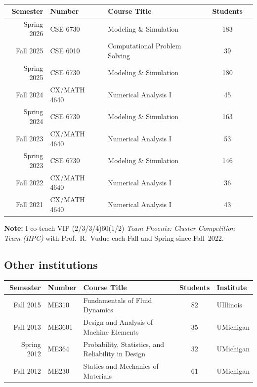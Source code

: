 \subsection{\GIT}

\begin{center}
    \begin{longtable}{ r l l c c }
        \bf Semester&\bf Number      & \bf Course Title                 & \bf Students  \\ \midrule
        Spring 2026 & CSE 6730       & Modeling \& Simulation           & 183 \\
        Fall 2025   & CSE 6010       & Computational Problem Solving    & \phantom{1}39 \\
        Spring 2025 & CSE 6730       & Modeling \& Simulation           & 180 \\
        Fall 2024   & CX/MATH 4640   & Numerical Analysis I             & \phantom{1}45 \\
        Spring 2024 & CSE 6730       & Modeling \& Simulation           & 163 \\
        Fall 2023   & CX/MATH 4640   & Numerical Analysis I             & \phantom{1}53 \\
        Spring 2023 & CSE 6730       & Modeling \& Simulation           & 146           \\
        Fall 2022   & CX/MATH 4640   & Numerical Analysis I             & \phantom{1}36 \\
        Fall 2021   & CX/MATH 4640   & Numerical Analysis I             & \phantom{1}43 
    \end{longtable}
\end{center}
\vspace{-0.8cm}
\textbf{Note:} I co-teach VIP (2/3/3/4)60(1/2) \textit{Team Phoenix: Cluster Competition Team (HPC)} with Prof.~R.~Vuduc each Fall and Spring since Fall~2022.

\subsection{Other institutions}

\begin{center}
    \begin{tabular}{ r l l c l }
        \bf Semester  &\bf Number & \bf Course Title & \bf Students & \bf Institute \\
        \midrule
        Fall   2015 & ME310  & Fundamentals of Fluid Dynamics & 82 & UIllinois \\
        Fall   2013 & ME3601 & Design and Analysis of Machine Elements & 35 & UMichigan\\
        Spring 2012 & ME364  & Probability, Statistics, and Reliability in Design & 32 & UMichigan \\
        Fall   2012 & ME230  & Statics and Mechanics of Materials & 61 & UMichigan \\
    \end{tabular}
\end{center}

